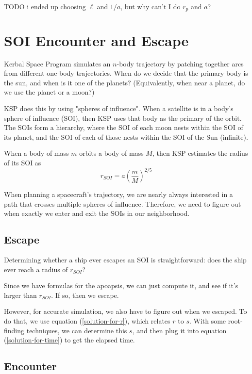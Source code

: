 \documentclass{article}
\numberwithin{equation}{subsection}
\begin{document}
TODO i ended up choosing $\ell$ and $1/a$, but why can't I do $r_p$ and $a$?


\section{SOI Encounter and Escape}

Kerbal Space Program simulates an $n$-body trajectory by patching together arcs from different one-body trajectories. When do we decide that the primary body is the sun, and when is it one of the planets? (Equivalently, when near a planet, do we use the planet or a moon?)

KSP does this by using "spheres of influence". When a satellite is in a body's sphere of influence (SOI), then KSP uses that body as the primary of the orbit. The SOIs form a hierarchy, where the SOI of each moon nests within the SOI of its planet, and the SOI of each of those nests within the SOI of the Sun (infinite).

When a body of mass $m$ orbits a body of mass $M$, then KSP estimates the radius of its SOI as
\begin{equation}
r_{SOI} = a \left( \frac{m}{M} \right)^{2/5}
\end{equation}

When planning a spacecraft's trajectory, we are nearly always interested in a path that crosses multiple spheres of influence. Therefore, we need to figure out when exactly we enter and exit the SOIs in our neighborhood.

\subsection{Escape}

Determining whether a ship ever escapes an SOI is straightforward: does the ship ever reach a radius of $r_{SOI}$?

Since we have formulas for the apoapsis, we can just compute it, and see if it's larger than $r_{SOI}$. If so, then we escape.

However, for accurate simulation, we also have to figure out when we escaped. To do that, we use equation (\ref{solution-for-r}), which relates $r$ to $s$. With some root-finding techniques, we can determine this $s$, and then plug it into equation (\ref{solution-for-time}) to get the elapsed time.


\subsection{Encounter}
\end{document}
